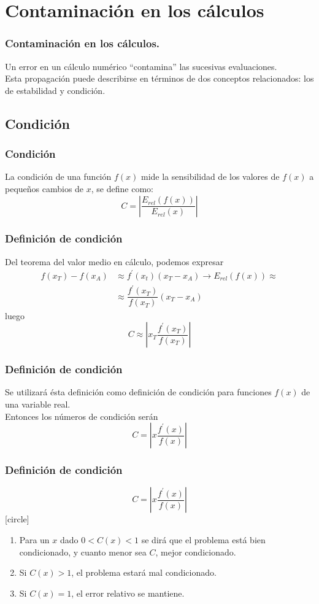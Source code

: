 \section{Contaminación en los cálculos}
\begin{frame}
\frametitle{Contaminación en los cálculos.}
Un error en un cálculo numérico \enquote{contamina} las sucesivas evaluaciones.
\\
\bigskip
Esta propagación puede describirse en términos de dos conceptos relacionados: los de estabilidad y condición.
\end{frame}
\subsection{Condición}
\begin{frame}
\frametitle{Condición}
La condición de una función $f(x)$ mide la sensibilidad de los valores de $f(x)$ a pequeños
cambios de $x$, se define como:
\[ C = \left | \dfrac{E_{rel} (f(x))}{E_{rel}(x)} \right |  \]
\end{frame}
\begin{frame}
\frametitle{Definición de condición}
Del teorema del valor medio en cálculo, podemos expresar
\[ \begin{split} f(x_{T}) - f(x_{A}) & \approx f^{\prime}(x_{t})(x_{T} - x_{A}) \rightarrow E_{rel}(f(x)) \approx \\ 
 & \approx \dfrac{f^{\prime}(x_{T})}{f(x_{T})} (x_{T} - x_{A}) \end{split} \]
luego
\[ C \approx \left | x_{T} \dfrac{f^{\prime}(x_{T})}{f(x_{T})} \right | \]
\end{frame}
\begin{frame}
\frametitle{Definición de condición}
Se utilizará ésta definición como definición de condición para funciones $f(x)$ de una variable real.
\\
\bigskip
Entonces los números de condición serán
\[ C = \left | x \dfrac{f^{\prime}(x)}{f(x)} \right | \]
\end{frame}
\begin{frame}
\frametitle{Definición de condición}
\[ C = \left | x \dfrac{f^{\prime}(x)}{f(x)} \right | \]
[circle]
\begin{enumerate}[<+->]
\item Para un $x$ dado $0 < C(x) < 1$ se dirá que el problema está bien condicionado, y cuanto menor sea $C$, mejor condicionado.
\item Si $C(x) > 1$, el problema estará mal condicionado.
\item Si $C(x) = 1$, el error relativo se mantiene.
\end{enumerate}
\end{frame}
